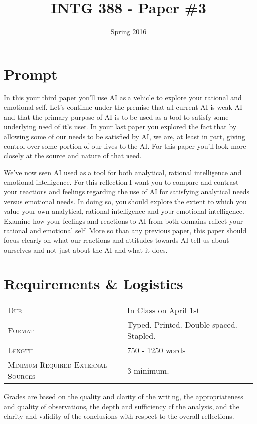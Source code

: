 \documentclass[nobib]{tufte-handout}
\title{INTG 388 - Paper \#3 }
\author{}
\date{ Spring 2016 }
\begin{document}
\maketitle

\section{Prompt}


In this your third paper you'll use AI as a vehicle to explore your rational and emotional self.  Let's continue under the premise that all current AI is weak AI and that the primary purpose of AI is to be used as a tool to satisfy some underlying need of it's user. In your last paper you explored the fact that by allowing some of our needs to be satisfied by AI, we are, at least in part, giving control over some portion of our lives to the AI.  For this paper you'll look more closely at the source and nature of that need. 

We've now seen AI used as a tool for both analytical, rational intelligence and emotional intelligence. For this reflection I want you to compare and contrast your reactions and feelings regarding the use of AI for satisfying analytical needs versus emotional needs.  In doing so, you should explore the extent to which you value your own analytical, rational intelligence and your emotional intelligence. Examine how your feelings and reactions to AI from both domains reflect your rational and emotional self. More so than any previous paper, this paper should focus clearly on what our reactions and attitudes towards AI tell us about ourselves and not just about the AI and what it does. 

\section{Requirements \& Logistics}

\begin{tabular}{ll}
\textsc{Due} & In Class on April 1st  \\
\textsc{Format} & Typed. Printed. Double-spaced. Stapled. \\
\textsc{Length} & 750 - 1250 words \\
\textsc{Minimum Required External Sources} & 3 minimum.  
\end{tabular}

\vspace{.1in}
Grades are based on the quality and clarity of the writing, the appropriateness and quality of observations, the depth and sufficiency of the analysis, and the clarity and validity of the conclusions with respect to the overall reflections.  
\end{document}
